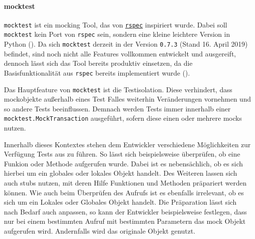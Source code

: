 \paragraph{mocktest}\label{python-tools:mocktest}\mbox{}
\newline
\lstinline{mocktest} ist ein \gls{mock}ing Tool, das von
\href{http://rspec.info/}{\lstinline{rspec}}
inspiriert wurde. Dabei soll \lstinline{mocktest} kein Port von
\lstinline{rspec} sein, sondern eine kleine leichtere
Version in Python (\cite{mocktest:doc}). Da sich \lstinline{mocktest} derzeit in
der Version \lstinline{0.7.3} (Stand 16. April 2019) befindet, sind noch nicht
alle Features vollkommen entwickelt und ausgereift, dennoch lässt sich das Tool
bereits produktiv einsetzen, da die Basisfunktionalität aus
\lstinline{rspec} bereits implementiert wurde
(\cite{mocktest:doc}).
\newline

Das Hauptfeature von \lstinline{mocktest} ist die Testisolation. Diese
verhindert, dass \Gls{mock}objekte außerhalb eines Test Falles weiterhin
Veränderungen vornehmen und so andere Tests beeinflussen. Demnach werden Tests
immer innerhalb einer \lstinline{mocktest.MockTransaction} ausgeführt, sofern
diese einen oder mehrere \Glspl{mock} nutzen.

Innerhalb dieses Kontextes stehen dem Entwickler verschiedene Möglichkeiten zur
Verfügung Tests aus zu führen. So lässt sich beispielsweise überprüfen, ob eine
Funkion oder Methode aufgerufen wurde. Dabei ist es nebensächlich, ob es sich
hierbei um ein globales oder lokales Objekt handelt. Des Weiteren lassen sich
auch \Glspl{stub} nutzen, mit deren Hilfe Funktionen und Methoden präpariert
werden können. Wie auch beim Überprüfen des Aufrufs ist es ebenfalls irrelevant,
ob es sich um ein Lokales oder Globales Objekt handelt.
Die Präparation lässt sich nach Bedarf auch anpassen, so kann der Entwickler
beispielsweise festlegen, dass nur bei einem bestimmten Aufruf mit bestimmten
Parametern das \Gls{mock} Objekt aufgerufen wird. Andernfalls wird das originale
Objekt genutzt.
\newline

